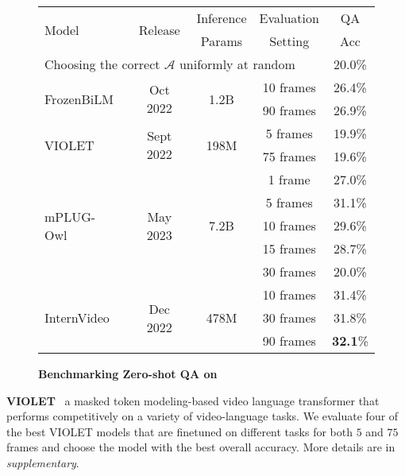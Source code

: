 \setlength{\columnsep}{5pt}
\setlength{\intextsep}{5pt}
\begin{wrapfigure}{r}{0.75\textwidth}
\centering
\caption{\textbf{Benchmarking Zero-shot QA on\name{}{}}}
\begin{tabular}{l|ccc|c}
\multirow{2}{*}{Model}  & \multirow{2}{*}{Release} & Inference & Evaluation & QA \\
& & Params & Setting & Acc \\
\toprule
\multicolumn{4}{l|}{Choosing the correct $\mathcal{A}$ uniformly at random} & 20.0\% 
\\ \midrule
\multirow{2}{*}{FrozenBiLM~\cite{bilm}}   & \multirow{2}{*}{Oct 2022} & \multirow{2}{*}{1.2B} & 10 frames  & 26.4\% \\
                     &   &  & 90 frames  &  26.9\%\\
\midrule
\multirow{2}{*}{VIOLET~\cite{violet}} & \multirow{2}{*}{Sept 2022} & \multirow{2}{*}{198M} & 5 frames   & 19.9\%  \\
                        & & &   75 frames  & 19.6\% \\
\midrule
\multirow{5}{*}{mPLUG-Owl~\cite{mplugowl}} & \multirow{5}{*}{May 2023} & \multirow{5}{*}{7.2B}  & 1 frame   & 27.0\%\\
& & & 5 frames   &   31.1\%\\
& & &   10 frames  & 29.6\% \\
& & &   15 frames  & 28.7\% \\
                        & & &   30 frames  & 20.0\% \\
\midrule
\multirow{3}{*}{InternVideo~\cite{internvideo}} & \multirow{3}{*}{Dec 2022} & \multirow{3}{*}{478M} 
                        &  10 frames  & 31.4\% \\
                        & & &  30 frames  & 31.8\% \\
\rowcolor{baselinecolor}
                        & & &  90 frames  & \textbf{32.1}\% \\
\bottomrule
\end{tabular}%
\label{tab:mcq_acc}
\end{wrapfigure}

\noindent\textbf{VIOLET}~\cite{violet} a masked token modeling-based video language transformer that performs competitively on a variety of video-language tasks. We evaluate four of the best VIOLET models that are finetuned on different tasks for both $5$ and $75$ frames and choose the model with the best overall accuracy. More details are in \textit{supplementary}. 

